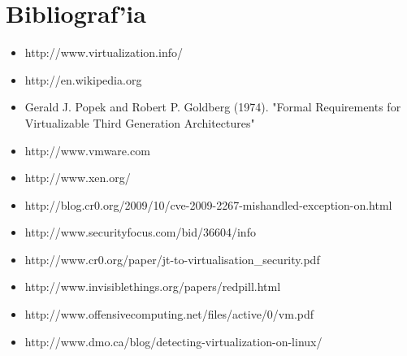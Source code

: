 \section{Bibliograf'ia}

\begin{itemize}
	\item http://www.virtualization.info/
	\item http://en.wikipedia.org
	\item Gerald J. Popek and Robert P. Goldberg (1974). "Formal Requirements for Virtualizable Third Generation Architectures"
	\item http://www.vmware.com
	\item http://www.xen.org/
	\item http://blog.cr0.org/2009/10/cve-2009-2267-mishandled-exception-on.html
	\item http://www.securityfocus.com/bid/36604/info
	\item http://www.cr0.org/paper/jt-to-virtualisation\_security.pdf
	\item http://www.invisiblethings.org/papers/redpill.html
	\item http://www.offensivecomputing.net/files/active/0/vm.pdf
	\item http://www.dmo.ca/blog/detecting-virtualization-on-linux/
\end{itemize}